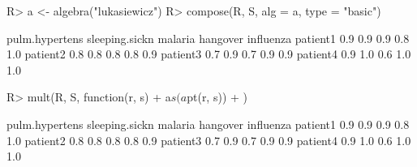 \documentclass{article}\usepackage[]{graphicx}\usepackage[]{color}
\begin{document}
\begin{Schunk}
% --begin: "comp.basic"
\begin{Sinput}
R> a <- algebra("lukasiewicz")
R> compose(R, S, alg = a, type = "basic")
\end{Sinput}
\begin{Soutput}
         pulm.hypertens sleeping.sickn malaria hangover influenza
patient1            0.9            0.9     0.9      0.8       1.0
patient2            0.8            0.8     0.8      0.8       0.9
patient3            0.7            0.9     0.7      0.9       0.9
patient4            0.9            1.0     0.6      1.0       1.0
\end{Soutput}
%
% --end: "comp.basic"
\end{Schunk}

\begin{Schunk}
% --begin: "comp.mult"
\begin{Sinput}
R> mult(R, S, function(r, s) {
+      a$s(a$pt(r, s))
+  })
\end{Sinput}
\begin{Soutput}
         pulm.hypertens sleeping.sickn malaria hangover influenza
patient1            0.9            0.9     0.9      0.8       1.0
patient2            0.8            0.8     0.8      0.8       0.9
patient3            0.7            0.9     0.7      0.9       0.9
patient4            0.9            1.0     0.6      1.0       1.0
\end{Soutput}
%
% --end: "comp.mult"
\end{Schunk}
\end{document}
